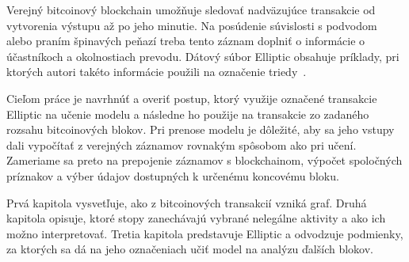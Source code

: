 Verejný bitcoinový blockchain umožňuje sledovať nadväzujúce
transakcie od vytvorenia výstupu až po jeho minutie. Na posúdenie
súvislosti s podvodom alebo praním špinavých peňazí treba tento záznam
doplniť o informácie o účastníkoch a okolnostiach prevodu. Dátový
súbor Elliptic obsahuje príklady, pri ktorých autori takéto informácie
použili na označenie triedy~\cite{weber2019elliptic}.

Cieľom práce je navrhnúť a overiť postup, ktorý využije označené
transakcie Elliptic na učenie modelu a následne ho použije na
transakcie zo zadaného rozsahu bitcoinových blokov. Pri prenose
modelu je dôležité, aby sa jeho vstupy dali vypočítať z verejných
záznamov rovnakým spôsobom ako pri učení. Zameriame sa preto
na prepojenie záznamov s blockchainom, výpočet spoločných príznakov
a výber údajov dostupných k určenému koncovému bloku.

Prvá kapitola vysvetľuje, ako z bitcoinových transakcií vzniká graf.
Druhá kapitola opisuje, ktoré stopy zanechávajú vybrané nelegálne
aktivity a ako ich možno interpretovať. Tretia kapitola predstavuje
Elliptic a odvodzuje podmienky, za ktorých sa dá na jeho označeniach
učiť model na analýzu ďalších blokov.
